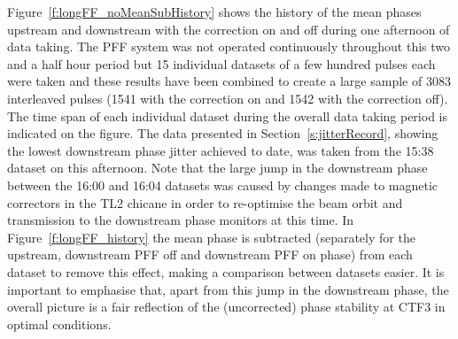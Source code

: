 Figure~\ref{f:longFF_noMeanSubHistory} shows the history of the mean phases upstream and downstream with the correction on and off during one afternoon of data taking. The PFF system was not operated continuously throughout this two and a half hour period but 15 individual datasets of a few hundred pulses each were taken and these results have been combined to create a large sample of 3083 interleaved pulses (1541 with the correction on and 1542 with the correction off). The time span of each individual dataset during the overall data taking period is indicated on the figure. The data presented in Section~\ref{s:jitterRecord}, showing the lowest downstream phase jitter achieved to date, was taken from the 15:38 dataset on this afternoon. Note that the large jump in the downstream phase between the 16:00 and 16:04 datasets was caused by changes made to magnetic correctors in the TL2 chicane in order to re-optimise the beam orbit and transmission to the downstream phase monitors at this time. In Figure~\ref{f:longFF_history} the mean phase is subtracted (separately for the upstream, downstream PFF off and downstream PFF on phase) from each dataset to remove this effect, making a comparison between datasets easier. It is important to emphasise that, apart from this jump in the downstream phase, the overall picture is a fair reflection of the (uncorrected) phase stability at CTF3 in optimal conditions.


